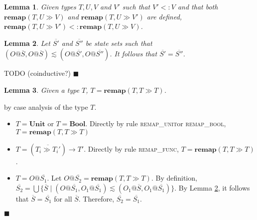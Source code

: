 \documentclass[preprint]{sigplanconf}
\makeatletter
\newtheorem{lem}{Lemma}
\newcommand{\lemref}[1]{Lemma \ref{#1}}
\newcommand{\remapunit}{\textsc{remap\_unit}}
\newcommand{\remapbool}{\textsc{remap\_bool}}
\newcommand{\remapfunc}{\textsc{remap\_func}}
\newcommand{\remapapp}[3]{\ensuremath{\mathbf{remap}(#1, #2 \gg #3)}}
\newcommand{\unitt}{\mathbf{Unit}}
\newcommand{\boolt}{\mathbf{Bool}}
\newcommand{\ot}[2]{#1@\overline{#2}}
\newcommand{\funt}[3]{(\overline{#1 \gg #2}) \rightarrow #3}
\newcommand{\qed}{$\blacksquare$}
\newenvironment{proof}{\vspace{1ex}\noindent{\bf Proof}\hspace{0.5em}}
  {\hfill\qed\vspace{1ex}}
\makeatother
\begin{document}

\begin{lem}
\label{lem:remap_out_cv}
Given types $T, U, V$ and $V'$ such that $V' <: V$ and that
both $\remapapp{T}{U}{V}$ and $\remapapp{T}{U}{V'}$ are defined,
$\remapapp{T}{U}{V'} <: \remapapp{T}{U}{V}$.
\end{lem}


\begin{lem}
\label{lem:lesssim_same}
Let $\overline{S'}$ and $\overline{S''}$ be state sets such that
$(\ot{O}{S}, \ot{O}{S}) \lesssim (\ot{O}{S'}, \ot{O}{S''})$. It follows
that $\overline{S'} = \overline{S''}$.
\end{lem}

\begin{proof}
TODO (coinductive?)
\end{proof}


\begin{lem}
\label{lem:remapsame}
Given a type $T$, $T = \remapapp{T}{T}{T}$.
\end{lem}

\begin{proof}
by case analysis of the type $T$.

\begin{itemize}
\item $T = \unitt$ or $T = \boolt$. 
Directly by rule \remapunit or \remapbool, $T = \remapapp{T}{T}{T}$

\item $T = \funt{T_i}{T_i'}{T'}$. Directly by rule
\remapfunc, $T = \remapapp{T}{T}{T}$.

\item $T = \ot{O}{S_1}$. Let $\ot{O}{S_2} = \remapapp{T}{T}{T}$. By definition,
$\overline{S_2} = \bigcup \{ \overline{S} \mid (\ot{O}{S_1}, \ot{O_1}{S_1}) \lesssim (\ot{O_1}{S}, \ot{O_1}{S_1}) \}$. By \lemref{lem:lesssim_same}, it follows that
$\overline{S} = \overline{S_1}$ for all $\overline{S}$. Therefore,
$\overline{S_2} = \overline{S_1}$.
\end{itemize}
\end{proof}
\end{document}
